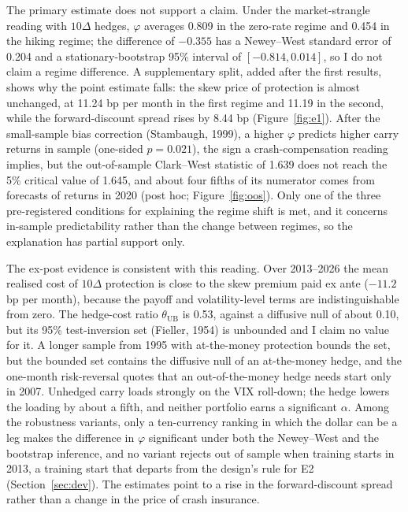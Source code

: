 \documentclass[11pt]{article}
\theoremstyle{result}
\newcommand{\thUB}{\theta_{\mathrm{UB}}}
\newcommand{\D}{\Delta}
\begin{document}
The primary estimate does not support a claim. Under the market-strangle reading with $10\D$ hedges, $\varphi$ averages 0.809 in the zero-rate regime and 0.454 in the hiking regime; the difference of $-0.355$ has a Newey--West standard error of 0.204 and a stationary-bootstrap 95\% interval of $[-0.814,0.014]$, so I do not claim a regime difference. A supplementary split, added after the first results, shows why the point estimate falls: the skew price of protection is almost unchanged, at 11.24 bp per month in the first regime and 11.19 in the second, while the forward-discount spread rises by 8.44 bp (Figure~\ref{fig:e1}). After the small-sample bias correction (Stambaugh, 1999), a higher $\varphi$ predicts higher carry returns in sample (one-sided $p=0.021$), the sign a crash-compensation reading implies, but the out-of-sample Clark--West statistic of 1.639 does not reach the 5\% critical value of 1.645, and about four fifths of its numerator comes from forecasts of returns in 2020 (post hoc; Figure~\ref{fig:oos}). Only one of the three pre-registered conditions for explaining the regime shift is met, and it concerns in-sample predictability rather than the change between regimes, so the explanation has partial support only.

The ex-post evidence is consistent with this reading. Over 2013--2026 the mean realised cost of $10\D$ protection is close to the skew premium paid ex ante ($-11.2$ bp per month), because the payoff and volatility-level terms are indistinguishable from zero. The hedge-cost ratio $\thUB$ is 0.53, against a diffusive null of about 0.10, but its 95\% test-inversion set (Fieller, 1954) is unbounded and I claim no value for it. A longer sample from 1995 with at-the-money protection bounds the set, but the bounded set contains the diffusive null of an at-the-money hedge, and the one-month risk-reversal quotes that an out-of-the-money hedge needs start only in 2007. Unhedged carry loads strongly on the VIX roll-down; the hedge lowers the loading by about a fifth, and neither portfolio earns a significant $\alpha$. Among the robustness variants, only a ten-currency ranking in which the dollar can be a leg makes the difference in $\varphi$ significant under both the Newey--West and the bootstrap inference, and no variant rejects out of sample when training starts in 2013, a training start that departs from the design's rule for E2 (Section~\ref{sec:dev}). The estimates point to a rise in the forward-discount spread rather than a change in the price of crash insurance.
\end{document}
